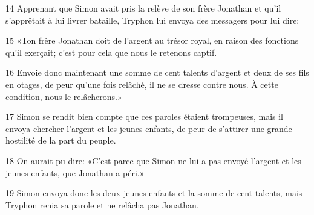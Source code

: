 
14 Apprenant que Simon avait pris la relève de son frère Jonathan et qu’il s’apprêtait à lui livrer bataille, Tryphon lui envoya des messagers pour lui dire:

15 «Ton frère Jonathan doit de l’argent au trésor royal, en raison des fonctions qu’il exerçait; c’est pour cela que nous le retenons captif.

16 Envoie donc maintenant une somme de cent talents d’argent et deux de ses fils en otages, de peur qu’une fois relâché, il ne se dresse contre nous. À cette condition, nous le relâcherons.»

17 Simon se rendit bien compte que ces paroles étaient trompeuses, mais il envoya chercher l’argent et les jeunes enfants, de peur de s’attirer une grande hostilité de la part du peuple.

18 On aurait pu dire: «C’est parce que Simon ne lui a pas envoyé l’argent et les jeunes enfants, que Jonathan a péri.»

19 Simon envoya donc les deux jeunes enfants et la somme de cent talents, mais Tryphon renia sa parole et ne relâcha pas Jonathan.